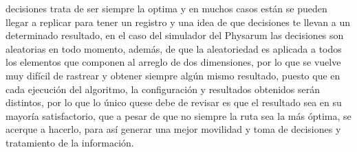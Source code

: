         decisiones trata de ser siempre la optima y en muchos casos
        est\'an se pueden llegar a replicar para tener un registro y una
        idea de que decisiones te llevan a un determinado resultado,
        en el caso del simulador del Physarum las decisiones son
        aleatorias en todo momento, adem\'as, de que la aleatoriedad
        es aplicada a todos los elementos que componen al arreglo
        de dos dimensiones, por lo que se vuelve muy dif\'icil de
        rastrear y obtener siempre alg\'un mismo resultado, puesto
        que en cada ejecuci\'on del algoritmo, la configuraci\'on y
        resultados obtenidos ser\'an distintos, por lo que lo \'unico quese debe de revisar es que el resultado sea en su mayor\'ia
        satisfactorio, que a pesar de que no siempre la ruta sea la
        m\'as \'optima, se acerque a hacerlo, para as\'i generar una mejor
        movilidad y toma de decisiones y tratamiento de la
        informaci\'on.
    \vskip 0.5cm
